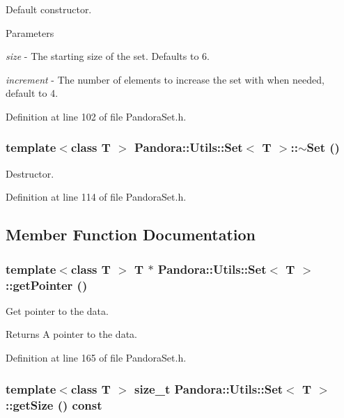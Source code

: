 Default constructor. 
\begin{DoxyParams}{Parameters}
\item[{\em size}]-\/ The starting size of the set. Defaults to 6. \item[{\em increment}]-\/ The number of elements to increase the set with when needed, default to 4. \end{DoxyParams}


Definition at line 102 of file PandoraSet.h.\hypertarget{classPandora_1_1Utils_1_1Set_a51d05d5d31cb8c16b510262737969f0e}{
\subsubsection[{$\sim$Set}]{\setlength{\rightskip}{0pt plus 5cm}template$<$class T $>$ {\bf Pandora::Utils::Set}$<$ T $>$::$\sim${\bf Set} ()}}
\label{classPandora_1_1Utils_1_1Set_a51d05d5d31cb8c16b510262737969f0e}


Destructor. 

Definition at line 114 of file PandoraSet.h.

\subsection{Member Function Documentation}
\hypertarget{classPandora_1_1Utils_1_1Set_a57d191182540ce79e9a0db1cf52ddd10}{
\subsubsection[{getPointer}]{\setlength{\rightskip}{0pt plus 5cm}template$<$class T $>$ T $\ast$ {\bf Pandora::Utils::Set}$<$ T $>$::getPointer ()}}
\label{classPandora_1_1Utils_1_1Set_a57d191182540ce79e9a0db1cf52ddd10}


Get pointer to the data. \begin{DoxyReturn}{Returns}
A pointer to the data. 
\end{DoxyReturn}


Definition at line 165 of file PandoraSet.h.\hypertarget{classPandora_1_1Utils_1_1Set_a80998fcb33af9bcd8ef6549f107ee1f6}{
\subsubsection[{getSize}]{\setlength{\rightskip}{0pt plus 5cm}template$<$class T $>$ size\_\-t {\bf Pandora::Utils::Set}$<$ T $>$::getSize () const}}
\label{classPandora_1_1Utils_1_1Set_a80998fcb33af9bcd8ef6549f107ee1f6}


